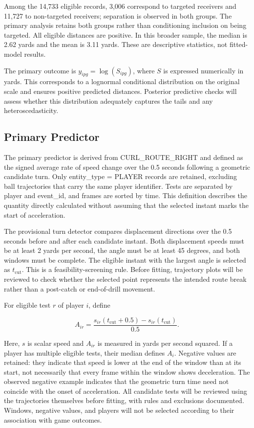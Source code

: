 \documentclass[a4paper,11pt]{article}
\newcommand{\code}[1]{{\small\ttfamily #1}}
\begin{document}
Among the 14,733 eligible records, 3,006 correspond to targeted receivers and 11,727 to non-targeted receivers; separation is observed in both groups. The primary analysis retains both groups rather than conditioning inclusion on being targeted. All eligible distances are positive. In this broader sample, the median is 2.62 yards and the mean is 3.11 yards. These are descriptive statistics, not fitted-model results.

The primary outcome is $y_{ipg}=\log(S_{ipg})$, where $S$ is expressed numerically in yards. This corresponds to a lognormal conditional distribution on the original scale and ensures positive predicted distances. Posterior predictive checks will assess whether this distribution adequately captures the tails and any heteroscedasticity.

\subsection{Primary Predictor}

The primary predictor is derived from \code{CURL\_\allowbreak{}ROUTE\_\allowbreak{}RIGHT} and defined as the signed average rate of speed change over the 0.5 seconds following a geometric candidate turn. Only \code{entity\_\allowbreak{}type = PLAYER} records are retained, excluding ball trajectories that carry the same player identifier. Tests are separated by player and \code{event\_\allowbreak{}id}, and frames are sorted by time. This definition describes the quantity directly calculated without assuming that the selected instant marks the start of acceleration.

The provisional turn detector compares displacement directions over the 0.5 seconds before and after each candidate instant. Both displacement speeds must be at least 2 yards per second, the angle must be at least 45 degrees, and both windows must be complete. The eligible instant with the largest angle is selected as $t_{\mathrm{cut}}$. This is a feasibility-screening rule. Before fitting, trajectory plots will be reviewed to check whether the selected point represents the intended route break rather than a post-catch or end-of-drill movement.

For eligible test $r$ of player $i$, define

\begin{equation}
A_{ir}=\frac{s_{ir}(t_{\mathrm{cut}}+0.5)-s_{ir}(t_{\mathrm{cut}})}{0.5}.
\end{equation}

Here, $s$ is scalar speed and $A_{ir}$ is measured in yards per second squared. If a player has multiple eligible tests, their median defines $A_i$. Negative values are retained: they indicate that speed is lower at the end of the window than at its start, not necessarily that every frame within the window shows deceleration. The observed negative example indicates that the geometric turn time need not coincide with the onset of acceleration. All candidate tests will be reviewed using the trajectories themselves before fitting, with rules and exclusions documented. Windows, negative values, and players will not be selected according to their association with game outcomes.
\end{document}
